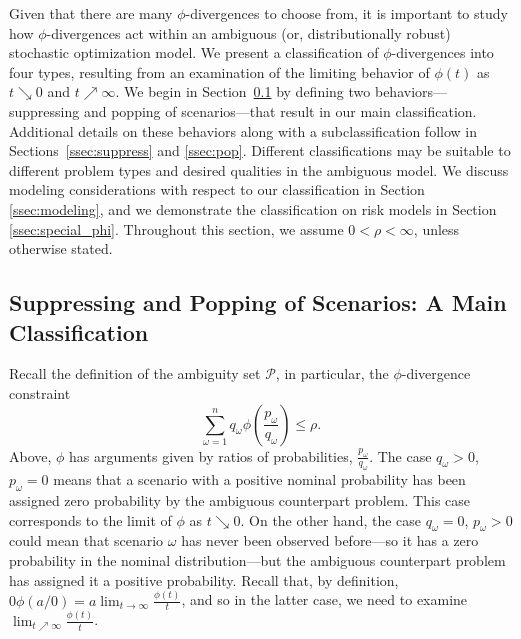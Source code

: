 \documentclass[opre,nonblindrev]{informs3} %
\begin{document}
Given that there are many $\phi$-divergences to choose from, it is important to study how $\phi$-divergences act within an ambiguous (or, distributionally robust) stochastic optimization model. 
We present a classification of $\phi$-divergences into four types, resulting from an examination of the limiting behavior of $\phi(t)$ as $t \searrow 0$ and $t \nearrow \infty$.
We begin in Section~\ref{ssec:suppressandpop} by defining two behaviors---suppressing and popping of scenarios---that result in our main classification. 
Additional details on these behaviors along with a subclassification follow in Sections~\ref{ssec:suppress} and \ref{ssec:pop}. 
Different classifications may be suitable to different problem types and desired qualities in the ambiguous model.
We discuss modeling considerations with respect to our classification in Section \ref{ssec:modeling}, and we demonstrate the classification on risk models in Section \ref{ssec:special_phi}.
Throughout this section, we assume $0<\rho<\infty$, unless otherwise stated. 




\subsection{Suppressing and Popping of Scenarios: A Main Classification}
\label{ssec:suppressandpop}

Recall the definition of the ambiguity set $\mathcal{P}$, in particular, the $\phi$-divergence constraint 
\[
\sum_{\omega = 1}^{n} q_\omega \phi\left(\frac{p_\omega}{q_\omega}\right) \leq \rho. 
\]
Above, $\phi$ has arguments given by ratios of probabilities, $\tfrac{p_\omega}{q_\omega}$. 
The case $q_\omega > 0$, $p_\omega = 0$ means that a scenario with a positive nominal probability has been assigned zero probability by the ambiguous counterpart problem. 
This case corresponds to the limit of $\phi$ as $t \searrow 0$. 
On the other hand, the case  $q_\omega = 0$, $p_\omega > 0$ could mean that scenario $\omega$ has never been observed before---so it has a zero probability in the nominal distribution---but the ambiguous counterpart problem has assigned it a positive probability. 
Recall that, by definition, $0 \phi(a/0) = a \lim_{t \rightarrow \infty} \frac{\phi(t)}{t}$, and so in the latter case, we need to examine $\lim_{t \nearrow \infty} \frac{\phi(t)}{t}$.  
\end{document}
